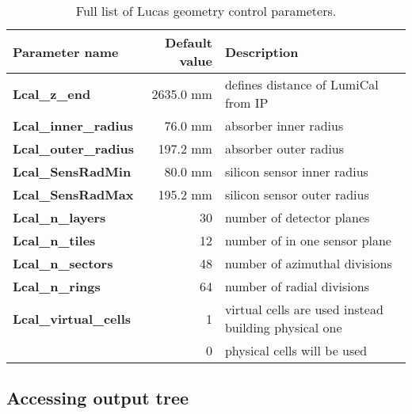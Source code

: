 \documentclass[10pt,notitlepage,twoside,a4paper]{scrartcl}
\begin{document}
\begin{table}[http]\label{lcalpars}
\begin{center}
\begin{tabular}{lrl}
\hline
 Parameter name & Default value &  Description \\
\hline
\bf{Lcal\_z\_end}       & 2635.0 mm & defines distance of LumiCal from IP\\
\bf{Lcal\_inner\_radius}&   76.0 mm & absorber inner radius \\
\bf{Lcal\_outer\_radius}& 197.2 mm  & absorber outer radius\\
\bf{Lcal\_SensRadMin}   &  80.0 mm  & silicon sensor inner radius\\
\bf{Lcal\_SensRadMax}   & 195.2 mm  & silicon sensor outer radius\\
\bf{Lcal\_n\_layers}    &       30  & number of detector planes\\
\bf{Lcal\_n\_tiles}     &       12  & number of in one sensor plane\\
\bf{Lcal\_n\_sectors}   &       48  & number of azimuthal divisions\\
\bf{Lcal\_n\_rings}     &       64  & number of radial divisions\\
\bf{Lcal\_virtual\_cells}& 1 & virtual cells are used instead building physical one \\
& 0 & physical cells will be used\\
\end{tabular}
\caption{Full list of Lucas geometry control parameters.}
\end{center}
\end{table}
 \subsection{Accessing output tree}\label{treeacces}
\end{document}
